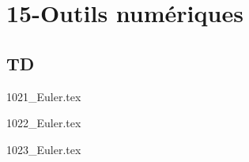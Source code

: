 \clearpage
\chapter{15-Outils numériques}

\section{TD}

\setcounter{question}{0}
{}
\graphicspath{{../15-Outils numériques/TD/1021_Euler/images/}{../15-Outils numériques/TD/1021_Euler/}{../Style/png/}}
{1021_Euler.tex}

\setcounter{question}{0}
{}
\graphicspath{{../15-Outils numériques/TD/1022_Euler/images/}{../15-Outils numériques/TD/1022_Euler/}{../Style/png/}}
{1022_Euler.tex}

\setcounter{question}{0}
{}
\graphicspath{{../15-Outils numériques/TD/1023_Euler/images/}{../15-Outils numériques/TD/1023_Euler/}{../Style/png/}}
{1023_Euler.tex}

